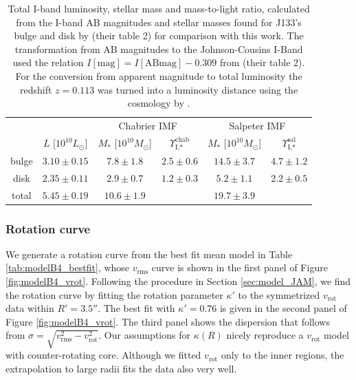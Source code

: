 \documentclass[useAMS,usenatbib]{mnras}
\begin{document}
\begin{table}
\centering
\caption{Total I-band luminosity, stellar mass and mass-to-light ratio, calculated from the I-band AB magnitudes and stellar masses found for J133's bulge and disk by \citet{SWELLSI} (their table 2) for comparison with this work. The transformation from AB magnitudes to the Johnson-Cousins I-Band used the relation $I[\text{mag}] = I[\text{ABmag}] - 0.309$ from \citet{FG1994} (their table 2). For the conversion from apparent magnitude to total luminosity the redshift $z=0.113$ \citet{SWELLSIII} was turned into a luminosity distance using the cosmology by \citet{WMAP5cosm}. }
\begin{tabular}{cccccc}
\hline\hline
& & \multicolumn{2}{c}{Chabrier IMF} & \multicolumn{2}{c}{Salpeter IMF}\\
      &  $L$ [$10^{10}L_{\odot}$]                & $M_*$ [$10^{10}M_\odot$]               & $\Upsilon_\text{I,*}^\text{chab}$ & $M_*$ [$10^{10}M_\odot$] & $\Upsilon_\text{I,*}^\text{sal}$ \\\hline
bulge &   $3.10 \pm 0.15 $  & $7.8 \pm 1.8$ & $2.5 \pm 0.6$ & $14.5 \pm 3.7 $ & $4.7 \pm 1.2$ \\
disk  &   $2.35 \pm 0.11 $  & $2.9 \pm 0.7$ & $1.2 \pm 0.3$ & $5.2 \pm 1.1$ & $2.2 \pm 0.5$ \\
total &   $5.45 \pm 0.19$ & $10.6 \pm 1.9$& & $19.7 \pm 3.9$&\\\hline
\end{tabular}
\label{tab:previousresults}
\end{table}

\subsubsection{Rotation curve}

We generate a rotation curve from the best fit mean model in Table \ref{tab:modelB4_bestfit}, whose $v_\text{rms}$ curve is shown in the first panel of Figure \ref{fig:modelB4_vrot}. Following the procedure in Section \ref{sec:model_JAM}, we find the rotation curve by fitting the rotation parameter $\kappa'$ to the symmetrized $v_\text{rot}$ data within $R' = 3.5''$. The best fit with $\kappa' = 0.76$ is given in the second panel of Figure \ref{fig:modelB4_vrot}. The third panel shows the dispersion that follows from $\sigma = \sqrt{v_\text{rms}^2 - v_\text{rot}^2}$. Our assumptions for $\kappa(R)$ nicely reproduce a $v_\text{rot}$ model with counter-rotating core. Although we fitted $v_\text{rot}$ only to the inner regions, the extrapolation to large radii fits the data also very well.
\end{document}
